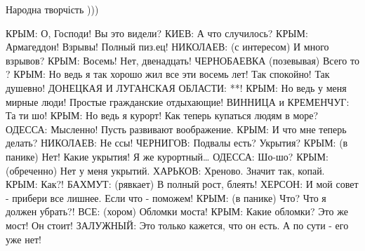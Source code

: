 Народна творчість )))

\obeycr
КРЫМ: О, Господи! Вы это видели?
КИЕВ: А что случилось?
КРЫМ: Армагеддон! Взрывы! Полный пиз.ец!
НИКОЛАЕВ: (с интересом) И много взрывов?
КРЫМ: Восемь! Нет, двенадцать!
ЧЕРНОБАЕВКА (позевывая) Всего то ?
КРЫМ: Но ведь я так хорошо жил все эти восемь лет! Так спокойно! Так душевно!
ДОНЕЦКАЯ И ЛУГАНСКАЯ ОБЛАСТИ: **!
КРЫМ: Но ведь у меня мирные люди! Простые гражданские отдыхающие!
ВИННИЦА и КРЕМЕНЧУГ: Та ти шо!
КРЫМ: Но ведь я курорт! Как теперь купаться людям в море?
ОДЕССА: Мысленно! Пусть развивают воображение.
КРЫМ: И что мне теперь делать?
НИКОЛАЕВ: Не ссы!
ЧЕРНИГОВ: Подвалы есть? Укрытия?
КРЫМ: (в панике) Нет! Какие укрытия! Я же курортный…
ОДЕССА: Шо-шо?
КРЫМ: (обреченно) Нет у меня укрытий.
ХАРЬКОВ: Хреново. Значит так, копай.
КРЫМ: Как?!
БАХМУТ: (рявкает) В полный рост, блеять!
ХЕРСОН: И мой совет - прибери все лишнее. Если что - поможем!
КРЫМ: (в панике) Что? Что я должен убрать?!
ВСЕ: (хором) Обломки моста!
КРЫМ: Какие обломки? Это же мост! Он стоит!
ЗАЛУЖНЫЙ: Это только кажется, что он есть. А по сути - его уже нет!
\restorecr
